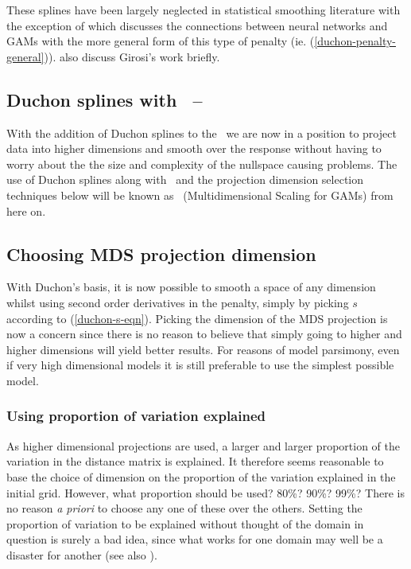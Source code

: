 These splines have been largely neglected in statistical smoothing literature with the exception of \cite{girosi} which discusses the connections between neural networks and GAMs with the more general form of this type of penalty (ie. (\ref{duchon-penalty-general})). \cite[p. 168]{elements} also discuss Girosi's work briefly.

\subsection{Duchon splines with \mdsap\ -- \mdsds}

With the addition of Duchon splines to the \mdsap\ we are now in a position to project data into higher dimensions and smooth over the response without having to worry about the the size and complexity of the nullspace causing problems. The use of Duchon splines along with \mdsap\ and the projection dimension selection techniques below will be known as \mdsds\ (Multidimensional Scaling for GAMs) from here on.

\subsection{Choosing MDS projection dimension}

With Duchon's basis, it is now possible to smooth a space of any dimension whilst using second order derivatives in the penalty, simply by picking $s$ according to (\ref{duchon-s-eqn}). Picking the dimension of the MDS projection is now a concern since there is no reason to believe that simply going to higher and higher dimensions will yield better results. For reasons of model parsimony, even if very high dimensional models it is still preferable to use the simplest possible model.

\subsubsection{Using proportion of variation explained}

As higher dimensional projections are used, a larger and larger proportion of the variation in the distance matrix is explained. It therefore seems reasonable to base the choice of dimension on the proportion of the variation explained in the initial grid. However, what proportion should be used? 80\%? 90\%? 99\%? There is no reason \textit{a priori} to choose any one of these over the others. Setting the proportion of variation to be explained without thought of the domain in question is surely a bad idea, since what works for one domain may well be a disaster for another (see also ).

